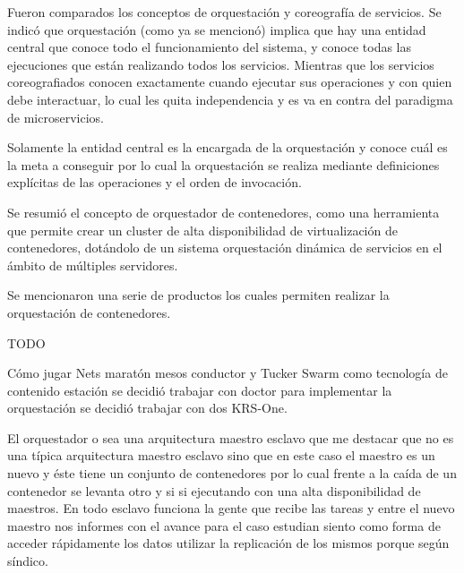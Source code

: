 Fueron comparados los conceptos de orquestación y coreografía de servicios. Se indicó que orquestación (como ya se mencionó) implica que hay una entidad central que conoce todo el funcionamiento del sistema, y conoce todas las ejecuciones que están realizando todos los servicios. Mientras que los servicios coreografiados conocen exactamente cuando ejecutar sus operaciones y con quien debe interactuar, lo cual les quita independencia y es va en contra del paradigma de microservicios. 

Solamente la entidad central es la encargada de la orquestación y conoce cuál es la meta a conseguir por lo cual la orquestación se realiza mediante definiciones explícitas de las operaciones y el orden de invocación. 
 
 
 Se resumió el concepto de orquestador de contenedores, como una herramienta que permite crear un cluster de alta disponibilidad de virtualización de contenedores, dotándolo de un sistema orquestación dinámica de servicios en el ámbito de múltiples servidores.

 Se mencionaron una serie de productos los cuales permiten realizar la orquestación de contenedores. 
 

TODO

 Cómo jugar Nets maratón mesos conductor y Tucker Swarm como tecnología de contenido estación se decidió trabajar con doctor para implementar la orquestación se decidió trabajar con dos KRS-One. 
 
 
 El orquestador o sea una arquitectura maestro esclavo que me destacar que no es una típica arquitectura maestro esclavo sino que en este caso el maestro es un nuevo y éste tiene un conjunto de contenedores por lo cual frente a la caída de un contenedor se levanta otro y si si ejecutando con una alta disponibilidad de maestros.
  En todo esclavo funciona la gente que recibe las tareas y entre el nuevo maestro nos informes con el avance para el caso estudian siento como forma de acceder rápidamente los datos utilizar la replicación de los mismos porque según síndico. 
  
